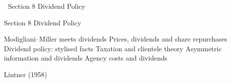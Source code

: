 

Section 8 Dividend Policy

Section 8 Dividend Policy

Modigliani–Miller meets dividends
Prices, dividends and share repurchases
Dividend policy: stylised facts 
Taxation and clientele theory 
Asymmetric information and dividends
Agency costs and dividends 

Lintner (1958)


